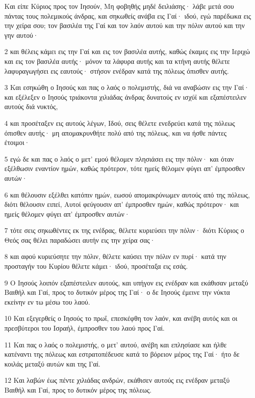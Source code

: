 \par Και είπε Κύριος προς τον Ιησούν, Μη φοβηθής μηδέ δειλιάσης· λάβε μετά σου πάντας τους πολεμικούς άνδρας, και σηκωθείς ανάβα εις Γαί· ιδού, εγώ παρέδωκα εις την χείρα σου; τον βασιλέα της Γαί και τον λαόν αυτού και την πόλιν αυτού και την γην αυτού·
\par 2 και θέλεις κάμει εις την Γαί και εις τον βασιλέα αυτής, καθώς έκαμες εις την Ιεριχώ και εις τον βασιλέα αυτής· μόνον τα λάφυρα αυτής και τα κτήνη αυτής θέλετε λαφυραγωγήσει εις εαυτούς· στήσον ενέδραν κατά της πόλεως όπισθεν αυτής.
\par 3 Και εσηκώθη ο Ιησούς και πας ο λαός ο πολεμιστής, διά να αναβώσιν εις την Γαί· και εξέλεξεν ο Ιησούς τριάκοντα χιλιάδας άνδρας δυνατούς εν ισχύϊ και εξαπέστειλεν αυτούς διά νυκτός,
\par 4 και προσέταξεν εις αυτούς λέγων, Ιδού, σεις θέλετε ενεδρεύει κατά της πόλεως όπισθεν αυτής· μη απομακρυνθήτε πολύ από της πόλεως, και να ήσθε πάντες έτοιμοι·
\par 5 εγώ δε και πας ο λαός ο μετ' εμού θέλομεν πλησιάσει εις την πόλιν· και όταν εξέλθωσιν εναντίον ημών, καθώς πρότερον, τότε ημείς θέλομεν φύγει απ' έμπροσθεν αυτών·
\par 6 και θέλουσιν εξέλθει κατόπιν ημών, εωσού απομακρύνωμεν αυτούς από της πόλεως, διότι θέλουσιν ειπεί, Αυτοί φεύγουσιν απ' έμπροσθεν ημών, καθώς πρότερον· και ημείς θέλομεν φύγει απ' έμπροσθεν αυτών·
\par 7 τότε σεις σηκωθέντες εκ της ενέδρας, θέλετε κυριεύσει την πόλιν· διότι Κύριος ο Θεός σας θέλει παραδώσει αυτήν εις την χείρα σας·
\par 8 και αφού κυριεύσητε την πόλιν, θέλετε καύσει την πόλιν εν πυρί· κατά την προσταγήν του Κυρίου θέλετε κάμει· ιδού, προσέταξα εις εσάς.
\par 9 Ο Ιησούς λοιπόν εξαπέστειλεν αυτούς, και υπήγον εις ενέδραν και εκάθισαν μεταξύ Βαιθήλ και Γαί, προς το δυτικόν μέρος της Γαί· ο δε Ιησούς έμεινε την νύκτα εκείνην εν τω μέσω του λαού.
\par 10 Και εξεγερθείς ο Ιησούς το πρωΐ, επεσκέφθη τον λαόν, και ανέβη αυτός και οι πρεσβύτεροι του Ισραήλ, έμπροσθεν του λαού προς Γαί.
\par 11 Και πας ο λαός ο πολεμιστής, ο μετ' αυτού, ανέβη και επλησίασε και ήλθε κατέναντι της πόλεως και εστρατοπέδευσε κατά το βόρειον μέρος της Γαί· ήτο δε κοιλάς μεταξύ αυτών και της Γαί.
\par 12 Και λαβών έως πέντε χιλιάδας ανδρών, εκάθισεν αυτούς εις ενέδραν μεταξύ Βαιθήλ και Γαί, προς το δυτικόν μέρος της πόλεως.

